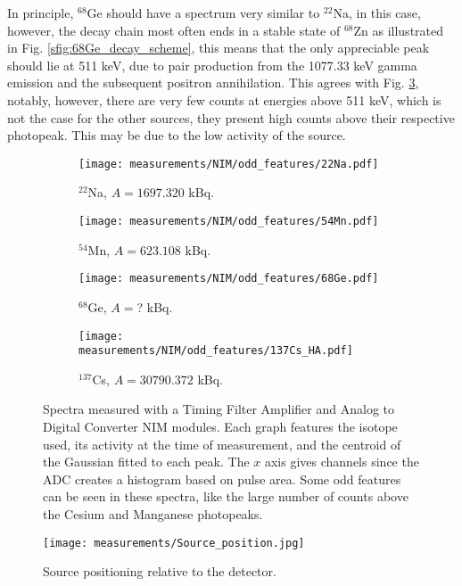 In principle, $^{68}$Ge should have a spectrum very similar to $^{22}$Na, in this case, however, the decay chain most often ends in a stable state of $^{68}$Zn as illustrated in Fig. \ref{sfig:68Ge_decay_scheme}, this means that the only appreciable peak should lie at 511 \unit{\kilo\eV}, due to pair production from the 1077.33 \unit{\kilo\eV} gamma emission and the subsequent positron annihilation. This agrees with Fig. \ref{sfig:NIM_odd_68Ge}, notably, however, there are very few counts at energies above 511 \unit{\kilo\eV}, which is not the case for the other sources, they present high counts above their respective photopeak. This may be due to the low activity of the source. 

\begin{figure}[H]
  \begin{subfigure}[t]{0.47\textwidth}
    \centering
    \texttt{[image: measurements/NIM/odd\_features/22Na.pdf]}
    \caption{\label{sfig:NIM_odd_22Na}$^{22}$Na, $A=1697.320$ kBq.}
  \end{subfigure}
  \hfill
  \begin{subfigure}[t]{0.47\textwidth}
    \centering
    \texttt{[image: measurements/NIM/odd\_features/54Mn.pdf]}
    \caption{\label{sfig:NIM_odd_54Mn}$^{54}$Mn, $A=623.108$ kBq.}
  \end{subfigure}
  \medskip
  \begin{subfigure}[t]{0.47\textwidth}
    \centering
    \texttt{[image: measurements/NIM/odd\_features/68Ge.pdf]}
    \caption{\label{sfig:NIM_odd_68Ge}$^{68}$Ge, $A=$? kBq.}
  \end{subfigure}
  \hfill
  \begin{subfigure}[t]{0.47\textwidth}
    \centering
    \texttt{[image: measurements/NIM/odd\_features/137Cs\_HA.pdf]}
    \caption{\label{sfig:NIM_odd_137Cs}$^{137}$Cs, $A=30790.372$ kBq.}
  \end{subfigure}
  \caption{\label{fig:NIM_odd_features}Spectra measured with a Timing Filter Amplifier and Analog to Digital Converter NIM modules. Each graph features the isotope used, its activity at the time of measurement, and the centroid of the Gaussian fitted to each peak. The $x$ axis gives channels since the ADC creates a histogram based on pulse area. Some odd features can be seen in these spectra, like the large number of counts above the Cesium and Manganese photopeaks.}
\end{figure}

\begin{figure}[H]
  \centering
  \texttt{[image: measurements/Source\_position.jpg]}
  \caption{\label{fig:source_position}Source positioning relative to the detector.}
\end{figure}

